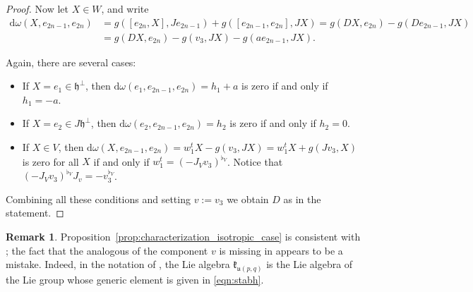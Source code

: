 \documentclass{article}
\theoremstyle{definition}
\newtheorem{remark}[theorem]{Remark}
\newcommand{\frh}{\mathfrak{h}}
\renewcommand{\d}{\mathrm{d}}
\newcommand{\lie}[1]{\mathfrak{#1}}
\begin{document}
\begin{proof}
    Now let $X\in W$, and write \begin{align*}
        \d\omega(X,e_{2n-1},e_{2n})&=g([e_{2n},X],Je_{2n-1})+g([e_{2n-1},e_{2n}],JX)=g(DX,e_{2n})-g(De_{2n-1},JX)\\
        &=g(DX,e_{2n})-g(v_3,JX)-g(ae_{2n-1},JX).
    \end{align*}

    Again, there are several cases: \begin{itemize}
        \item If $X=e_1\in\frh^\perp$, then $\d\omega(e_1,e_{2n-1},e_{2n})=h_1+a$ is zero if and only if $h_1=-a$.
        \item If $X=e_2\in J\frh^\perp$, then $\d\omega(e_2,e_{2n-1},e_{2n})=h_2$ is zero if and only if $h_2=0$.
        \item If $X\in V$, then $\d\omega(X,e_{2n-1},e_{2n})=w_1^tX-g(v_3,JX)=w_1^tX+g(Jv_3,X)$ is zero for all $X$ if and only if $w_1^t=(-J_Vv_3)^{\flat_V}$. Notice that $(-J_Vv_3)^{\flat_V}J_v=-v_3^{\flat_V}$.
    \end{itemize}

    Combining all these conditions and setting $v:=v_3$ we obtain $D$ as in the statement.
\end{proof}

\begin{remark}\label{remark:freibertisotropic}
    Proposition~\ref{prop:characterization_isotropic_case} is consistent with \cite[Theorem 2.43]{Freibert24_TFHS}; the fact that the analogous of the component $v$ is missing in \cite[Example 2.45]{Freibert24_TFHS} appears to be a mistake. Indeed, in the notation of \cite{Freibert24_TFHS}, the Lie algebra $\lie k_{\lie u(p,q)}$ is the Lie algebra of the Lie group whose generic element is given in \eqref{eqn:stabh}.
\end{remark}
\end{document}
